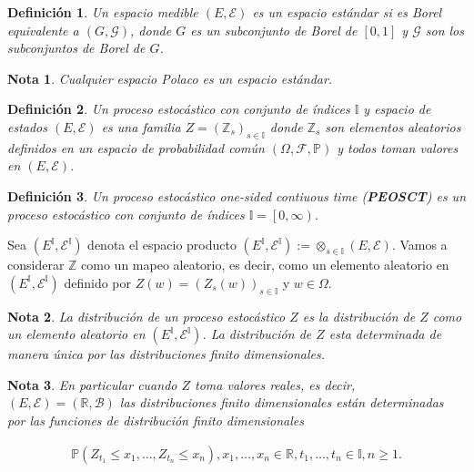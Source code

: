 \documentclass{article}
\newtheorem{Def}{Definición}
\newtheorem{Note}{Nota}
\newcommand{\prob}{\mathbb{P}}
\begin{document}
\begin{Def}
Un espacio medible  $\left(E,\mathcal{E}\right)$ es un \textit{espacio est\'andar} si es Borel equivalente a $\left(G,\mathcal{G}\right)$, donde $G$ es un subconjunto de Borel de $\left[0,1\right]$ y $\mathcal{G}$ son los subconjuntos de Borel de $G$.
\end{Def}

\begin{Note}
Cualquier espacio Polaco es un espacio est\'andar.
\end{Note}


\begin{Def}
Un proceso estoc\'astico con conjunto de \'indices $\mathbb{I}$ y espacio de estados $\left(E,\mathcal{E}\right)$ es una familia $Z=\left(\mathbb{Z}_{s}\right)_{s\in\mathbb{I}}$ donde $\mathbb{Z}_{s}$ son elementos aleatorios definidos en un espacio de probabilidad com\'un $\left(\Omega,\mathcal{F},\prob\right)$ y todos toman valores en $\left(E,\mathcal{E}\right)$.
\end{Def}

\begin{Def}
Un proceso estoc\'astico \textit{one-sided contiuous time} (\textbf{PEOSCT}) es un proceso estoc\'astico con conjunto de \'indices $\mathbb{I}=\left[0,\infty\right)$.
\end{Def}


Sea $\left(E^{\mathbb{I}},\mathcal{E}^{\mathbb{I}}\right)$ denota el espacio producto $\left(E^{\mathbb{I}},\mathcal{E}^{\mathbb{I}}\right):=\otimes_{s\in\mathbb{I}}\left(E,\mathcal{E}\right)$. Vamos a considerar $\mathbb{Z}$ como un mapeo aleatorio, es decir, como un elemento aleatorio en $\left(E^{\mathbb{I}},\mathcal{E}^{\mathbb{I}}\right)$ definido por $Z\left(w\right)=\left(Z_{s}\left(w\right)\right)_{s\in\mathbb{I}}$ y $w\in\Omega$.

\begin{Note}
La distribuci\'on de un proceso estoc\'astico $Z$ es la distribuci\'on de $Z$ como un elemento aleatorio en $\left(E^{\mathbb{I}},\mathcal{E}^{\mathbb{I}}\right)$. La distribuci\'on de $Z$ esta determinada de manera \'unica por las distribuciones finito dimensionales.
\end{Note}

\begin{Note}
En particular cuando $Z$ toma valores reales, es decir, $\left(E,\mathcal{E}\right)=\left(\mathbb{R},\mathcal{B}\right)$ las distribuciones finito dimensionales est\'an determinadas por las funciones de distribuci\'on finito dimensionales

\begin{eqnarray}
\prob\left(Z_{t_{1}}\leq x_{1},\ldots,Z_{t_{n}}\leq x_{n}\right),x_{1},\ldots,x_{n}\in\mathbb{R},t_{1},\ldots,t_{n}\in\mathbb{I},n\geq1.
\end{eqnarray}
\end{Note}
\end{document}

